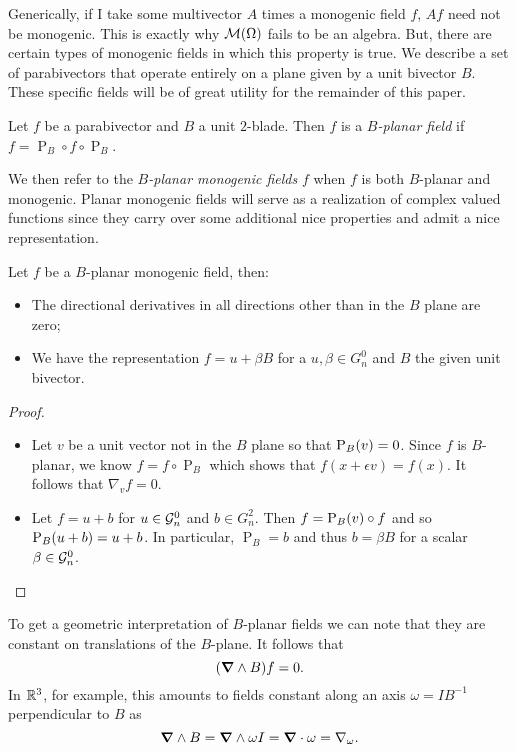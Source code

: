 Generically, if I take some multivector $A$ times a monogenic field $f$, $Af$ need not be monogenic. This is exactly why $\mathcal{M}(\Omega)$ fails to be an algebra. But, there are certain types of monogenic fields in which this property is true. We describe a set of parabivectors that operate entirely on a plane given by a unit bivector $B$. These specific fields will be of great utility for the remainder of this paper.
\begin{definition}
    Let $f$ be a parabivector and $B$ a unit $2$-blade. Then $f$ is a \emph{$B$-planar field} if $f = \operatorname{P}_B \circ f \circ \operatorname{P}_B$.
\end{definition} 
We then refer to the \emph{$B$-planar monogenic fields} $f$ when $f$ is both $B$-planar and monogenic. Planar monogenic fields will serve as a realization of complex valued functions since they carry over some additional nice properties and admit a nice representation.
\begin{lemma}
    Let $f$ be a $B$-planar monogenic field, then:
\begin{itemize}
    \item The directional derivatives in all directions other than in the $B$ plane are zero;
    \item We have the representation $f=u+\beta B$ for a $u,\beta \in G_n^0$ and $B$ the given unit bivector.
\end{itemize}
\end{lemma}
\begin{proof}
~
    \begin{itemize}
    \item Let $v$ be a unit vector not in the $B$ plane so that $\operatorname{P}_{B}(v)=0$. Since $f$ is $B$-planar, we know $f=f \circ \operatorname{P}_B$ which shows that $f(x+\epsilon v)= f(x)$.  It follows that $\nabla_v f=0$.
    \item Let $f=u+b$ for $u\in \mathcal{G}_n^0$ and $b\in G_n^2$. Then $f=\operatorname{P}_{B}(v) \circ f$ and so $\operatorname{P}_{B}(u+b)=u+b$. In particular, $\operatorname{P}_B=b$ and thus $b=\beta B$ for a scalar $\beta \in \mathcal{G}_n^0$.
\end{itemize}
\end{proof}
To get a geometric interpretation of $B$-planar fields we can note that they are constant on translations of the $B$-plane.  It follows that 
\begin{equation}
\label{eq:exterior_b_derivative}
(\boldsymbol{\nabla} \wedge B)f = 0.
\end{equation}
In $\mathbb{R}^3$, for example, this amounts to fields constant along an axis $\omega=IB^{-1}$ perpendicular to $B$ as
\begin{equation}
\label{eq:omega_axial_equivalence}
\boldsymbol{\nabla} \wedge B = \boldsymbol{\nabla} \wedge \omega I =\boldsymbol{\nabla} \cdot \omega = \nabla_\omega.
\end{equation}

